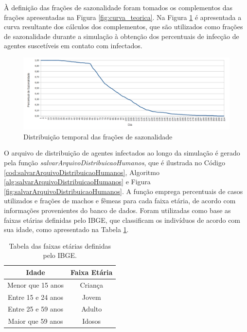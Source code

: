 À definição das frações de sazonalidade foram tomados os complementos das frações apresentadas na Figura \ref{fig:curva_teorica}. Na Figura \ref{fig:percentuais_sazonalidade} é apresentada a curva resultante dos cálculos dos complementos, que são utilizados como frações de sazonalidade durante a simulação à obtenção dos percentuais de infecção de agentes suscetíveis em contato com infectados. 

\begin{figure}[H]
  \centering
  \includegraphics[width=1\textwidth]{Figuras/Observacoes/Sazonalidade.png}
  \caption{Distribuição temporal das frações de sazonalidade}
  \label{fig:percentuais_sazonalidade}
\end{figure} 

O arquivo de distribuição de agentes infectados ao longo da simulação é gerado pela função \textit{salvarArquivoDistribuicaoHumanos}, que é ilustrada no Código \ref{cod:salvarArquivoDistribuicaoHumanos}, Algoritmo \ref{alg:salvarArquivoDistribuicaoHumanos} e Figura \ref{fig:salvarArquivoDistribuicaoHumanos}. A função emprega percentuais de casos utilizados e frações de machos e fêmeas para cada faixa etária, de acordo com informações provenientes do banco de dados. Foram utilizadas como base as faixas etárias definidas pelo IBGE, que classificam os indivíduos de acordo com sua idade, como apresentado na Tabela \ref{tab:faixasEtariasIBGE}.  

\begin{table}[H]
\centering
\begin{tabular}{c|c}
 \textbf{Idade} 	& \textbf{Faixa Etária}	\\ \hline
 Menor que 15 anos 	& Criança		\\
 Entre 15 e 24 anos 	& Jovem			\\
 Entre 25 e 59 anos 	& Adulto		\\
 Maior que 59 anos 	& Idosos		\\
\end{tabular}
\caption{Tabela das faixas etárias definidas pelo IBGE.}
\label{tab:faixasEtariasIBGE}
\end{table}

